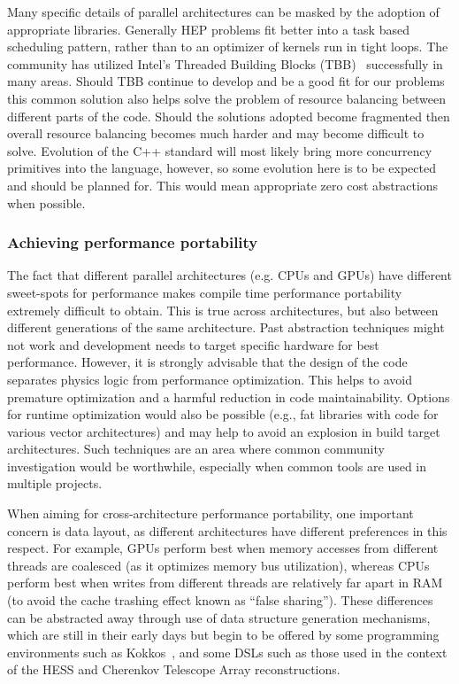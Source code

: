 \documentclass[12pt,a4paper]{article}
\begin{document}
Many specific details of parallel architectures can be masked by the
adoption of appropriate libraries. Generally HEP problems fit better
into a task based scheduling pattern, rather than to an optimizer of
kernels run in tight loops. The community has utilized Intel's Threaded
Building Blocks (TBB)~\cite{Pheatt:2008:ITB:1352079.1352134,TBB} successfully in
many areas. Should TBB continue to develop and be a good fit for our problems
this common solution also helps solve the problem of resource balancing between different parts of
the code. Should the solutions adopted become fragmented then overall
resource balancing becomes much harder and may become difficult to
solve. Evolution of the C++ standard will most likely bring more
concurrency primitives into the language, however, so some evolution
here is to be expected and should be planned for. This would mean
appropriate zero cost abstractions when possible.

\hypertarget{achieving-performance-portability}{%
\subsubsection{Achieving performance
portability~}\label{achieving-performance-portability}}

The fact that different parallel architectures (e.g. CPUs and GPUs) have
different sweet-spots for performance makes compile time performance
portability extremely difficult to obtain. This is true across
architectures, but also between different generations of the same
architecture. Past abstraction techniques might not work and development
needs to target specific hardware for best performance. However, it is
strongly advisable that the design of the code separates physics logic
from performance optimization. This helps to avoid premature
optimization and a harmful reduction in code maintainability. Options
for runtime optimization would also be possible (e.g., fat libraries
with code for various vector architectures) and may help to avoid an
explosion in build target architectures. Such techniques are an area
where common community investigation would be worthwhile, especially
when common tools are used in multiple projects.

When aiming for cross-architecture performance portability, one
important concern is data layout, as different architectures have
different preferences in this respect. For example, GPUs perform best
when memory accesses from different threads are coalesced (as it
optimizes memory bus utilization), whereas CPUs perform best when writes
from different threads are relatively far apart in RAM (to avoid the
cache trashing effect known as ``false sharing''). These differences can
be abstracted away through use of data structure generation mechanisms,
which are still in their early days but begin to be offered by some
programming environments such as
Kokkos~\cite{CarterEdwards20143202},
and some DSLs such as those used in the context of the HESS and Cherenkov Telescope Array
reconstructions.
\end{document}
